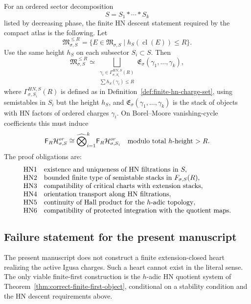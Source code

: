 For an ordered sector decomposition
\[
  S=S_1*\cdots*S_k
\]
listed by decreasing phase, the finite HN descent statement required by
the compact atlas is the following.  Let
\[
  \mathfrak M_{\sigma,S}^{\le R}
  =
  \{E\in\mathfrak M_{\sigma,S}\mid h_S(\operatorname{cl}(E))\le R\}.
\]
Use the same height \(h_S\) on each subsector \(S_i\subset S\).  Then
\[
  \mathfrak M_{\sigma,S}^{\le R}
  \simeq
  \bigsqcup_{\substack{\gamma_i\in\Gamma_{\sigma,S_i}^{HN,S}(R)\\
  \sum h_S(\gamma_i)\le R}}
  \mathfrak E_{\sigma}(\gamma_1,\ldots,\gamma_k),
\]
where \(\Gamma_{\sigma,S_i}^{HN,S}(R)\) is defined as in
Definition~\ref{def:finite-hn-charge-set}, using semistables in
\(S_i\) but the height \(h_S\), and
\(\mathfrak E_{\sigma}(\gamma_1,\ldots,\gamma_k)\) is the stack of
objects with HN factors of ordered charges \(\gamma_i\).  On
Borel--Moore vanishing-cycle coefficients this must induce
\[
  \mathsf F_R\mathcal H_{\sigma,S}^{or}
  \cong
  \widehat{\bigotimes}_{i=1}^k
  \mathsf F_R\mathcal H_{\sigma,S_i}^{or}
  \quad\hbox{modulo total \(h\)-height \(>R\)}.
\]
The proof obligations are:
\[
\begin{array}{ll}
\mathrm{HN1} & \hbox{existence and uniqueness of HN filtrations in }S,\\
\mathrm{HN2} & \hbox{bounded finite type of semistable stacks in }F_{\sigma,S}(R),\\
\mathrm{HN3} & \hbox{compatibility of critical charts with extension stacks},\\
\mathrm{HN4} & \hbox{orientation transport along HN filtrations},\\
\mathrm{HN5} & \hbox{continuity of Hall product for the \(h\)-adic topology},\\
\mathrm{HN6} & \hbox{compatibility of protected integration with the quotient maps}.
\end{array}
\]

\subsection{Failure statement for the present manuscript}

\begin{theorem}
\label{thm:finite-heart-obstruction}
The present manuscript does not construct a finite extension-closed
heart realizing the active Igusa charges.  Such a heart cannot exist in
the literal sense.  The only viable finite-first construction is the
\(h\)-adic HN quotient system of
Theorem~\ref{thm:correct-finite-first-object}, conditional on a
stability condition and the HN descent requirements above.
\end{theorem}

